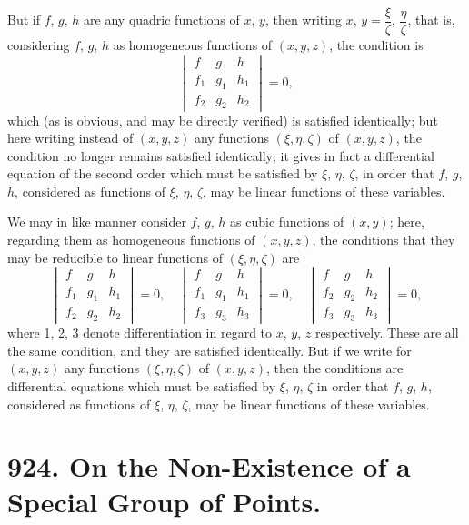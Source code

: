 \documentclass[11pt,a4paper]{book}
\begin{document}
{{{But if $f$, $g$, $h$ are any quadric functions of $x$, $y$, then writing $x$, $y = \dfrac{\xi}{\zeta}$,
$\dfrac{\eta}{\zeta}$, that is, considering $f$, $g$, $h$ as homogeneous functions of $(x, y, z)$, the
condition is
\[
\begin{vmatrix}
f & g & h\\
f_1 & g_1 & h_1\\
f_2 & g_2 & h_2
\end{vmatrix} = 0,
\]
which (as is obvious, and may be directly verified) is satisfied identically; but here
writing instead of $(x, y, z)$ any functions $(\xi, \eta, \zeta)$ of $(x, y, z)$, the condition no longer
remains satisfied identically; it gives in fact a differential equation of the second
order which must be satisfied by $\xi$, $\eta$, $\zeta$, in order that $f$, $g$, $h$, considered as functions
of $\xi$, $\eta$, $\zeta$, may be linear functions of these variables.

\newpage
We may in like manner consider $f$, $g$, $h$ as cubic functions of $(x, y)$; here, regarding
them as homogeneous functions of $(x, y, z)$, the conditions that they may be reducible
to linear functions of $(\xi, \eta, \zeta)$ are
\[
\begin{vmatrix}
f & g & h\\
f_1 & g_1 & h_1\\
f_2 & g_2 & h_2
\end{vmatrix} = 0,
\quad
\begin{vmatrix}
f & g & h\\
f_1 & g_1 & h_1\\
f_3 & g_3 & h_3
\end{vmatrix} = 0,
\quad
\begin{vmatrix}
f & g & h\\
f_2 & g_2 & h_2\\
f_3 & g_3 & h_3
\end{vmatrix} = 0,
\]
where 1, 2, 3 denote differentiation in regard to $x$, $y$, $z$ respectively. These are all
the same condition, and they are satisfied identically. But if we write for $(x, y, z)$
any functions $(\xi, \eta, \zeta)$ of $(x, y, z)$, then the conditions are differential equations which
must be satisfied by $\xi$, $\eta$, $\zeta$ in order that $f$, $g$, $h$, considered as functions of $\xi$, $\eta$, $\zeta$,
may be linear functions of these variables.



\newpage
\section*{924. On the Non-Existence of a Special Group of Points.}

}}}
\end{document}
